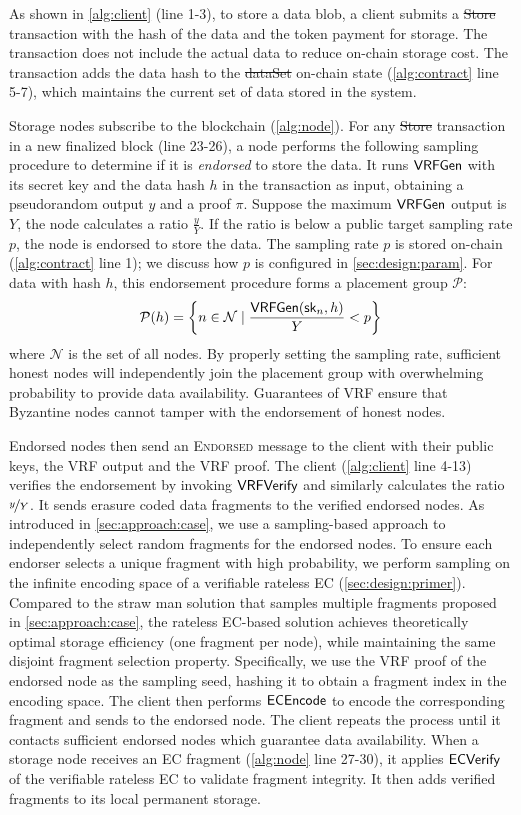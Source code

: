 As shown in \cref{alg:client} (line 1-3), to store a data blob, a client submits a \st{Store} transaction with the hash of the data and the token payment for storage.
The transaction does not include the actual data to reduce on-chain storage cost.
The transaction adds the data hash to the \st{dataSet} on-chain state (\cref{alg:contract} line 5-7), which maintains the current set of data stored in the system.

Storage nodes subscribe to the blockchain (\cref{alg:node}).
For any \st{Store} transaction in a new finalized block (line 23-26), a node performs the following sampling procedure to determine if it is \emph{endorsed} to store the data.
It runs $\textsf{VRFGen}$ with its secret key and the data hash $h$ in the transaction as input, obtaining a pseudorandom output $y$ and a proof $\pi$.
Suppose the maximum $\textsf{VRFGen}$ output is $Y$, the node calculates a ratio $\frac{y}{Y}$.
If the ratio is below a public target sampling rate $p$, the node is endorsed to store the data.
The sampling rate $p$ is stored on-chain (\cref{alg:contract} line 1);
we discuss how $p$ is configured in \cref{sec:design:param}.
For data with hash $h$, this endorsement procedure forms a placement group $\mathcal{P}$:
$$\mathcal{P}(h)=\left\{n\in\mathcal{N}\mid\frac{\textsf{VRFGen}(\textsf{sk}_n,h)}{Y}<p\right\}$$
where $\mathcal{N}$ is the set of all nodes.
By properly setting the sampling rate, sufficient honest nodes will independently join the placement group with overwhelming probability to provide data availability.
Guarantees of VRF ensure that Byzantine nodes cannot tamper with the endorsement of honest nodes.

Endorsed nodes then send an \textsc{Endorsed} message to the client with their public keys, the VRF output and the VRF proof.
The client (\cref{alg:client} line 4-13) verifies the endorsement by invoking $\textsf{VRFVerify}$ and similarly calculates the ratio $\nicefrac{y}{Y}$.
It sends erasure coded data fragments to the verified endorsed nodes.
As introduced in \cref{sec:approach:case}, we use a sampling-based approach to independently select random fragments for the endorsed nodes.
To ensure each endorser selects a unique fragment with high probability, we perform sampling on the infinite encoding space of a verifiable rateless EC (\cref{sec:design:primer}).
Compared to the straw man solution that samples multiple fragments proposed in \cref{sec:approach:case}, the rateless EC-based solution achieves theoretically optimal storage efficiency (one fragment per node), while maintaining the same disjoint fragment selection property.
Specifically, we use the VRF proof of the endorsed node as the sampling seed, hashing it to obtain a fragment index in the encoding space.
The client then performs $\textsf{ECEncode}$ to encode the corresponding fragment and sends to the endorsed node.
The client repeats the process until it contacts sufficient endorsed nodes which guarantee data availability.
When a storage node receives an EC fragment (\cref{alg:node} line 27-30), it applies $\textsf{ECVerify}$ of the verifiable rateless EC to validate fragment integrity.
It then adds verified fragments to its local permanent storage.

